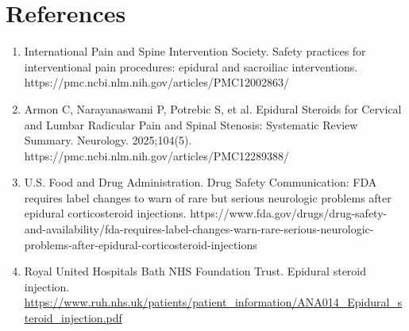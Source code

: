 \section*{References}
\begin{enumerate}
  \item International Pain and Spine Intervention Society. Safety practices for interventional pain procedures: epidural and sacroiliac interventions. https://pmc.ncbi.nlm.nih.gov/articles/PMC12002863/
  \item Armon C, Narayanaswami P, Potrebic S, et al. Epidural Steroids for Cervical and Lumbar Radicular Pain and Spinal Stenosis: Systematic Review Summary. Neurology. 2025;104(5). https://pmc.ncbi.nlm.nih.gov/articles/PMC12289388/
  \item U.S. Food and Drug Administration. Drug Safety Communication: FDA requires label changes to warn of rare but serious neurologic problems after epidural corticosteroid injections. https://www.fda.gov/drugs/drug-safety-and-availability/fda-requires-label-changes-warn-rare-serious-neurologic-problems-after-epidural-corticosteroid-injections
  \item Royal United Hospitals Bath NHS Foundation Trust. Epidural steroid injection. \url{https://www.ruh.nhs.uk/patients/patient_information/ANA014_Epidural_steroid_injection.pdf}
\end{enumerate}

\clearpage
